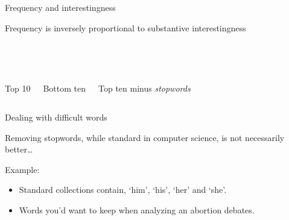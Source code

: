 \documentclass{hertieteaching}\usepackage[]{graphicx}\usepackage[]{color}
\begin{document}
\begin{frame}{Frequency and interestingness}

Frequency is inversely proportional to substantive interestingness

~\\
\begin{columns}[T,onlytextwidth]

\begin{center}


~\\
Top 10
\end{center}


\begin{center}



~\\
Bottom ten
\end{center}

\begin{center}


~\\
Top ten minus \textit{stopwords}
\end{center}

\end{columns}

\end{frame}

\begin{frame}{Dealing with difficult words}

Removing stopwords, while standard in computer science, is not necessarily better\ldots

Example:
\begin{itemize}
\item Standard collections contain, `him', `his', `her' and `she'.
\item Words you'd want to keep when analyzing an abortion debates.
\end{itemize}

\end{frame}
\end{document}
